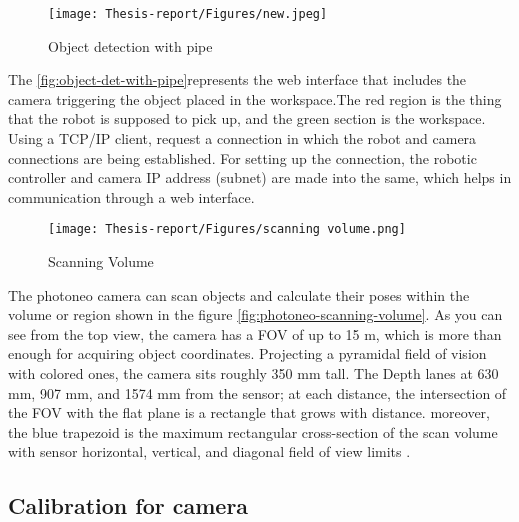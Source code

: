 \documentclass[12pt]{article}
\begin{document}
\begin{figure}[h]
    \centering
    \texttt{[image: Thesis-report/Figures/new.jpeg]}
    \caption{Object detection with pipe }
    \label{fig:object-det-with-pipe}
\end{figure}

 The \autoref{fig:object-det-with-pipe}represents the web interface that includes the camera triggering the object placed in the workspace.The red region is the thing that the robot is supposed to pick up, and the green section is the workspace. Using a TCP/IP client, request a connection in which the robot and camera connections are being established. For setting up the connection, the robotic controller and camera IP address (subnet) are made into the same, which helps in communication through a web interface.
 
\begin{figure}[h]
  \centering
  \texttt{[image: Thesis-report/Figures/scanning volume.png]}
  \caption{Scanning Volume \cite{ref18}}
  \label{fig:photoneo-scanning-volume}
\end{figure}

The photoneo camera can scan objects and calculate their poses within the volume or region shown in the figure \autoref{fig:photoneo-scanning-volume}.  As you can see from the top view, the camera has a FOV of up to 15 m, which is more than enough for acquiring object coordinates.  Projecting a pyramidal field of vision with colored ones, the camera sits roughly 350 mm tall. The Depth lanes at 630 mm, 907 mm, and 1574 mm from the sensor; at each distance, the intersection of the FOV with the flat plane is a rectangle that grows with distance. moreover, the blue trapezoid is the maximum rectangular cross-section of the scan volume with sensor horizontal, vertical, and diagonal field of view limits \cite{ref2}.


\subsection{Calibration for camera}
\end{document}
